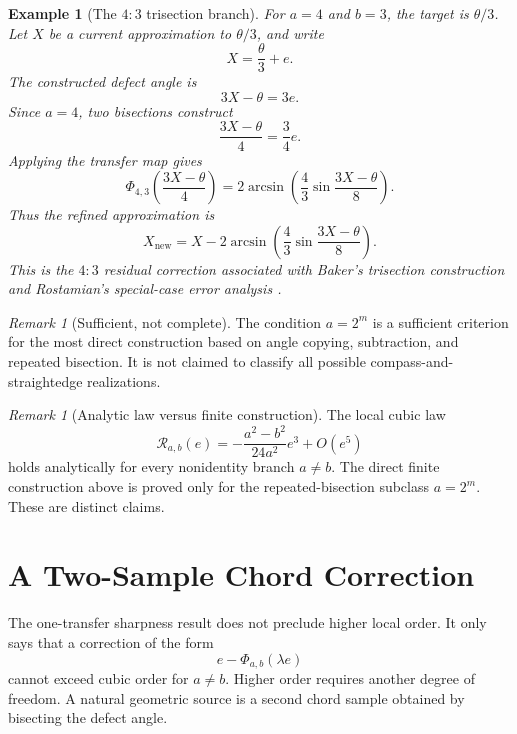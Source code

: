 \documentclass[11pt]{article}
\newtheorem{example}[theorem]{Example}
\theoremstyle{definition}
\theoremstyle{remark}
\newtheorem{remark}[theorem]{Remark}
\newcommand{\Rop}{\mathscr{R}}
\newcommand{\Phiop}{\Phi}
\begin{document}
\begin{example}[The $4:3$ trisection branch]
For $a=4$ and $b=3$, the target is $\theta/3$.  Let $X$ be a current
approximation to $\theta/3$, and write
\[
X=\frac{\theta}{3}+e.
\]
The constructed defect angle is
\[
3X-\theta=3e.
\]
Since $a=4$, two bisections construct
\[
\frac{3X-\theta}{4}=\frac{3}{4}e.
\]
Applying the transfer map gives
\[
\Phiop_{4,3}\!\left(\frac{3X-\theta}{4}\right)
=
2\arcsin\!\left(
\frac{4}{3}\sin\frac{3X-\theta}{8}
\right).
\]
Thus the refined approximation is
\[
X_{\mathrm{new}}
=
X-
2\arcsin\!\left(
\frac{4}{3}\sin\frac{3X-\theta}{8}
\right).
\]
This is the $4:3$ residual correction associated with Baker's trisection
construction and Rostamian's special-case error analysis
\cite{RostamianBaker}.
\end{example}

\begin{remark}[Sufficient, not complete]
The condition $a=2^m$ is a sufficient criterion for the most direct
construction based on angle copying, subtraction, and repeated bisection.  It
is not claimed to classify all possible compass-and-straightedge realizations.
\end{remark}

\begin{remark}[Analytic law versus finite construction]
The local cubic law
\[
\Rop_{a,b}(e)
=
-
\frac{a^2-b^2}{24a^2}e^3+O(e^5)
\]
holds analytically for every nonidentity branch $a\ne b$.  The direct finite
construction above is proved only for the repeated-bisection subclass
$a=2^m$.  These are distinct claims.
\end{remark}

\section{A Two-Sample Chord Correction}
\label{sec:two-sample}

The one-transfer sharpness result does not preclude higher local order.  It
only says that a correction of the form
\[
e-\Phiop_{a,b}(\lambda e)
\]
cannot exceed cubic order for $a\ne b$.  Higher order requires another degree
of freedom.  A natural geometric source is a second chord sample obtained by
bisecting the defect angle.
\end{document}
